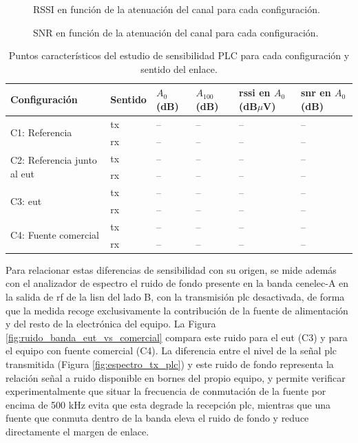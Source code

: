 \begin{figure}[htbp]
    \centering
    \caption{RSSI en función de la atenuación del canal para cada configuración.}
    \label{fig:rssi_vs_atenuacion}
\end{figure}

\begin{figure}[htbp]
    \centering
    \caption{SNR en función de la atenuación del canal para cada configuración.}
    \label{fig:snr_vs_atenuacion}
\end{figure}

\begin{table}[!h]
\centering
\small
\begin{tabular}{|p{3.4cm}|p{1.9cm}|p{1.6cm}|p{1.6cm}|p{2.2cm}|p{2.0cm}|}
\hline
\textbf{Configuración} & \textbf{Sentido} & \textbf{$A_{0}$ (dB)} & \textbf{$A_{100}$ (dB)} & \textbf{\gls{rssi} en $A_{0}$ (dB$\mu$V)} & \textbf{\gls{snr} en $A_{0}$ (dB)} \\ \hline
\multirow{2}{3.4cm}{C1: Referencia} & \gls{tx} & -- & -- & -- & -- \\ \cline{2-6}
 & \gls{rx} & -- & -- & -- & -- \\ \hline
\multirow{2}{3.4cm}{C2: Referencia junto al \gls{eut}} & \gls{tx} & -- & -- & -- & -- \\ \cline{2-6}
 & \gls{rx} & -- & -- & -- & -- \\ \hline
\multirow{2}{3.4cm}{C3: \gls{eut}} & \gls{tx} & -- & -- & -- & -- \\ \cline{2-6}
 & \gls{rx} & -- & -- & -- & -- \\ \hline
\multirow{2}{3.4cm}{C4: Fuente comercial} & \gls{tx} & -- & -- & -- & -- \\ \cline{2-6}
 & \gls{rx} & -- & -- & -- & -- \\ \hline
\end{tabular}
\caption{Puntos característicos del estudio de sensibilidad PLC para cada configuración y sentido del enlace.}
\label{tab:resultados_sensibilidad}
\end{table}

Para relacionar estas diferencias de sensibilidad con su origen, se mide además con el analizador de espectro el ruido de fondo presente en la banda \gls{cenelec}-A en la salida de \gls{rf} de la \gls{lisn} del lado B, con la transmisión \gls{plc} desactivada, de forma que la medida recoge exclusivamente la contribución de la fuente de alimentación y del resto de la electrónica del equipo. La Figura \ref{fig:ruido_banda_eut_vs_comercial} compara este ruido para el \gls{eut} (C3) y para el equipo con fuente comercial (C4). La diferencia entre el nivel de la señal \gls{plc} transmitida (Figura \ref{fig:espectro_tx_plc}) y este ruido de fondo representa la relación señal a ruido disponible en bornes del propio equipo, y permite verificar experimentalmente que situar la frecuencia de conmutación de la fuente por encima de 500 kHz evita que esta degrade la recepción \gls{plc}, mientras que una fuente que conmuta dentro de la banda eleva el ruido de fondo y reduce directamente el margen de enlace.

